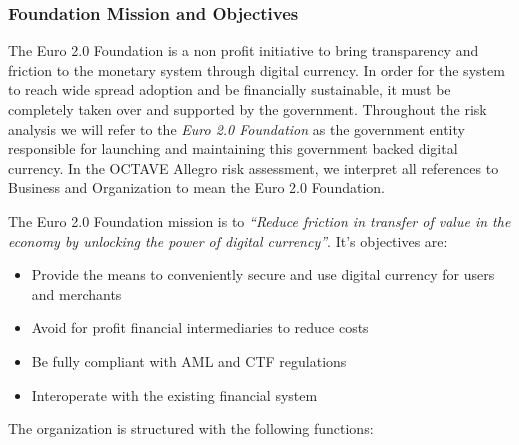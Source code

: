\documentclass[12pt]{article} %
\begin{document}
{\subsubsection{Foundation Mission and Objectives} \label{sssec:5.1:objectives}

The Euro 2.0 Foundation is a non profit initiative to bring transparency and friction to the monetary system through digital currency. In order for the system to reach wide spread adoption and be financially sustainable, it must be completely taken over and supported by the government. Throughout the risk analysis we will refer to the \textit{Euro 2.0 Foundation} as the government entity responsible for launching and maintaining this government backed digital currency. In the OCTAVE Allegro risk assessment, we interpret all references to Business and Organization to mean the Euro 2.0 Foundation.

The Euro 2.0 Foundation mission is to \textit{``Reduce friction in transfer of value in the economy by unlocking the power of digital currency''}. It's objectives are:

\begin{itemize}
	\item Provide the means to conveniently secure and use digital currency for users and merchants
	\item Avoid for profit financial intermediaries to reduce costs
	\item Be fully compliant with AML and CTF regulations
	\item Interoperate with the existing financial system
\end{itemize}

The organization is structured with the following functions:

\begin{center}
\end{center}
\label{tab:organizationStructure}

}
\end{document}
